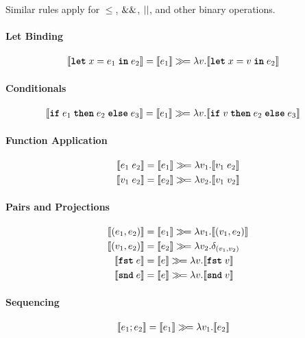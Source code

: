 Similar rules apply for $\leq$, $\logand$, $\logor$, and other binary operations.

\paragraph{Let Binding}
\begin{align*}
\sem{ \letkw \; x = e_1 \; \inkw \; e_2 } &= \sem{ e_1 } \gg\!= \lambda v. \sem{ \letkw \; x = v \; \inkw \; e_2 }
\end{align*}

\paragraph{Conditionals}
\begin{align*}
\sem{ \ifkw \; e_1 \; \thenkw \; e_2 \; \elsekw \; e_3 } &= \sem{ e_1 } \gg\!= \lambda v. \sem{ \ifkw \; v \; \thenkw \; e_2 \; \elsekw \; e_3 }
\end{align*}

\paragraph{Function Application}
\begin{align*}
\sem{ e_1 \; e_2 } &= \sem{ e_1 } \gg\!= \lambda v_1. \sem{ v_1 \; e_2 } \\
\sem{ v_1 \; e_2 } &= \sem{ e_2 } \gg\!= \lambda v_2. \sem{ v_1 \; v_2 }
\end{align*}

\paragraph{Pairs and Projections}
\begin{align*}
\sem{ (e_1, e_2) } &= \sem{ e_1 } \gg\!= \lambda v_1. \sem{ (v_1, e_2) } \\
\sem{ (v_1, e_2) } &= \sem{ e_2 } \gg\!= \lambda v_2. \delta_{(v_1, v_2)} \\
\sem{ \fstkw \; e } &= \sem{ e } \gg\!= \lambda v. \sem{ \fstkw \; v } \\
\sem{ \sndkw \; e } &= \sem{ e } \gg\!= \lambda v. \sem{ \sndkw \; v }
\end{align*}

\paragraph{Sequencing}
\begin{align*}
\sem{ e_1; e_2 } &= \sem{ e_1 } \gg\!= \lambda v_1. \sem{ e_2 }
\end{align*}

